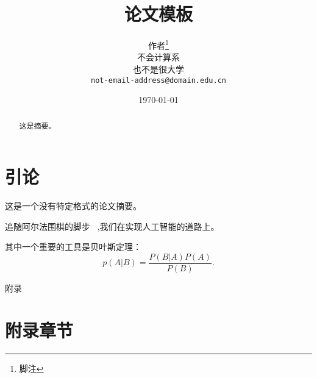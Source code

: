 \documentclass[11pt]{article}
\begin{document}
\title{论文模板}
\author{作者\thanks{脚注} \\
  不会计算系\\
  也不是很大学\\
  \texttt{not-email-address@domain.edu.cn} \\
}
\date{\today}
\maketitle
%



\begin{abstract}
这是摘要。
\end{abstract}


\section{引论}
这是一个没有特定格式的论文摘要。

追随阿尔法围棋的脚步 ~\cite{silver2016mastering},我们在实现人工智能的道路上。

其中一个重要的工具是贝叶斯定理：
\begin{equation}
    p(A|B) = \frac{P(B|A)P(A)}{P(B)}.
\end{equation}






\clearpage
{\centering \huge 附录}
\appendix
\section{附录章节}
\end{document}

